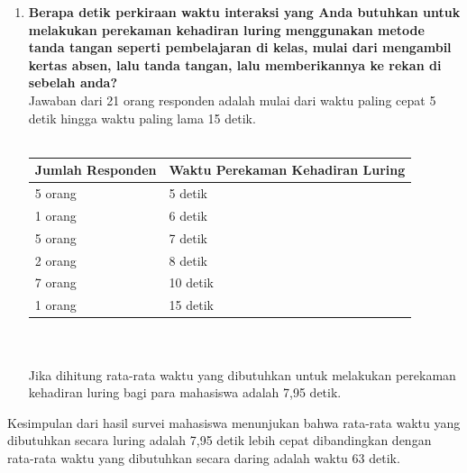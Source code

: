 \begin{enumerate}
	\item \textbf{Berapa detik perkiraan waktu interaksi yang Anda butuhkan untuk melakukan perekaman kehadiran luring menggunakan metode tanda tangan seperti pembelajaran di kelas, mulai dari mengambil kertas absen, lalu tanda tangan, lalu memberikannya ke rekan di sebelah anda?}\\
	Jawaban dari 21 orang responden adalah mulai dari waktu paling cepat 5 detik hingga waktu paling lama 15 detik.\\ \\
	  \begin{tabular}{|p{4cm} |p{7cm}|}
		\hline
		Jumlah Responden &  Waktu Perekaman Kehadiran Luring \\ \hline     
		5 orang &  5 detik\\ \hline 
		1 orang &  6 detik\\ \hline 
		5 orang &  7 detik\\ \hline 
		2 orang &  8 detik\\ \hline 
		7 orang &  10 detik\\ \hline 
		1 orang &  15 detik\\ \hline
	\end{tabular}\\ \\
	Jika dihitung rata-rata waktu yang dibutuhkan untuk melakukan perekaman kehadiran luring bagi para mahasiswa adalah 7,95 detik.
\end{enumerate}
Kesimpulan dari hasil survei mahasiswa menunjukan bahwa rata-rata waktu yang dibutuhkan secara luring adalah 7,95 detik lebih cepat dibandingkan dengan rata-rata waktu yang dibutuhkan secara daring adalah waktu 63 detik.

